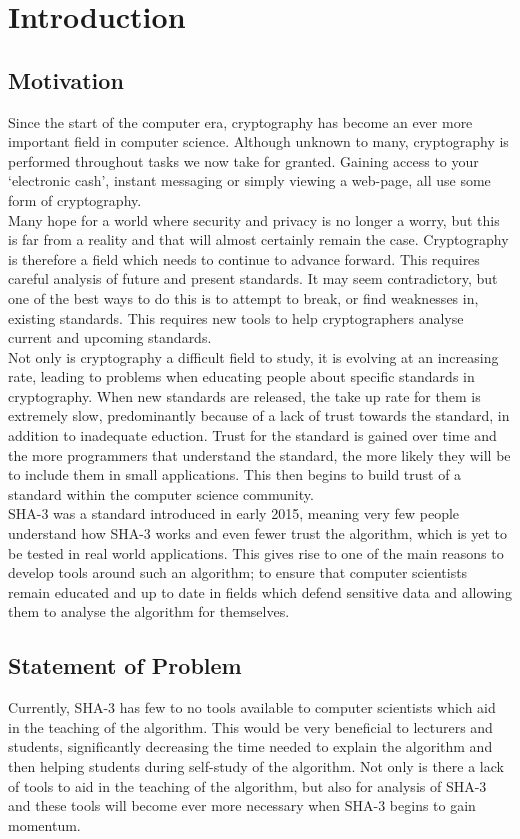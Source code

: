 \chapter{Introduction}
\section{Motivation}
Since the start of the computer era, cryptography has become an ever more important field in computer science. Although unknown to many, cryptography is performed throughout tasks we now take for granted. Gaining access to your `electronic cash',  instant messaging or simply viewing a web-page, all use some form of cryptography.
\vspace{5 mm}\\
Many hope for a world where security and privacy is no longer a worry, but this is far from a reality and that will almost certainly remain the case. Cryptography is therefore a field which needs to continue to advance forward. This requires careful analysis of future and present standards. It may seem contradictory, but one of the best ways to do this is to attempt to break, or find weaknesses in, existing standards. This requires new tools to help cryptographers analyse current and upcoming standards.
\vspace{5 mm}\\
Not only is cryptography a difficult field to study, it is evolving at an increasing rate, leading to problems when educating people about specific standards in cryptography. When new standards are released, the take up rate for them is extremely slow, predominantly because of a lack of trust towards the standard, in addition to inadequate eduction. Trust for the standard is gained over time and the more programmers that understand the standard, the more likely they will be to include them in small applications. This then begins to build trust of a standard within the computer science community.
\vspace{5 mm}\\
SHA-3 was a standard introduced in early 2015, meaning very few people understand how SHA-3 works and even fewer trust the algorithm, which is yet to be tested in real world applications. This gives rise to one of the main reasons to develop tools around such an algorithm; to ensure that computer scientists remain educated and up to date in fields which defend sensitive data and allowing them to analyse the algorithm for themselves.
\section{Statement of Problem}
\label{sec:StatementProb}
Currently, SHA-3 has few to no tools available to computer scientists which aid in the teaching of the algorithm. This would be very beneficial to lecturers and students, significantly decreasing the time needed to explain the algorithm and then helping students during self-study of the algorithm. Not only is there a lack of tools to aid in the teaching of the algorithm, but also for analysis of SHA-3 and these tools will become ever more necessary when SHA-3 begins to gain momentum.

